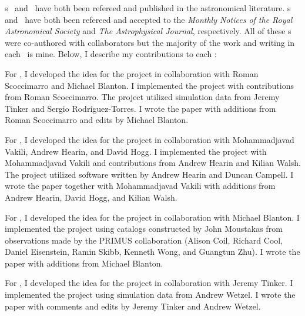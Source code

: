 \chapname s~ and~ have both been refereed and
published in the astronomical literature.
\chapname s~ and~ have both been refereed and accepted 
to the \emph{Monthly Notices of the Royal Astronomical Society} and \emph{The Astrophysical Journal},
respectively. All of these \chapname s were co-authored with collaborators but the majority
of the work and writing in each \chapname\ is mine. Below, I describe my contributions to each \chapname:
\begin{enumerate}

{\item 
For , I developed the idea for the project in collaboration with Roman
Scoccimarro and Michael Blanton. I implemented the project with contributions 
from Roman Scoccimarro. The project utilized simulation data from Jeremy Tinker
and Sergio Rodr\'{i}guez-Torres. I wrote the paper with additions from 
Roman Scoccimarro and edits by Michael Blanton. 
}

{\item 
For , I developed the idea for the project in collaboration with 
Mohammadjavad Vakili, Andrew Hearin, and David Hogg. I implemented the project 
with Mohammadjavad Vakili and contributions from Andrew Hearin and Kilian Walsh.
The project utilized software written by Andrew Hearin and Duncan Campell. 
I wrote the paper together with Mohammadjavad Vakili with additions from
Andrew Hearin, David Hogg, and Kilian Walsh.
}

{\item 
For , I developed the idea for the project in collaboration with 
Michael Blanton. I implemented the project using catalogs constructed by 
John Moustakas from observations made by the PRIMUS collaboration (Alison Coil,
Richard Cool, Daniel Eisenstein, Ramin Skibb, Kenneth Wong, and Guangtun Zhu).
I wrote the paper with additions from Michael Blanton. 
}

{\item 
For , I developed the idea for the project in collaboration with 
Jeremy Tinker. I implemented the project using simulation data from Andrew 
Wetzel. I wrote the paper with comments and edits by Jeremy Tinker and Andrew 
Wetzel. 
}
\end{enumerate}
